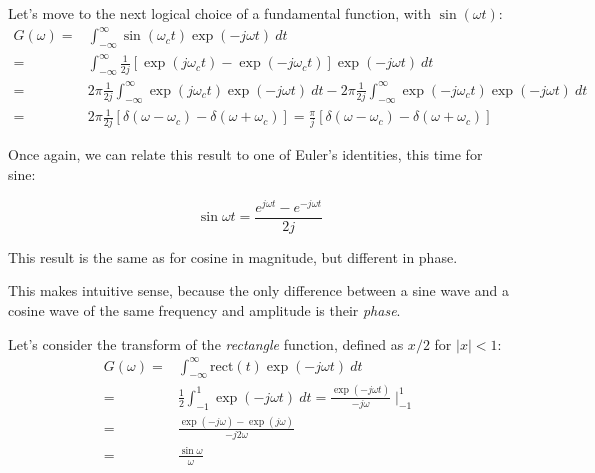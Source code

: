 \documentclass[11pt,letterpaper,draft]{exam}
\begin{document}
Let's move to the next logical choice of a fundamental function, with $\sin(\omega t)$:
\begin{equation}
\begin{split}
G(\omega) =& \int^{\infty}_{-\infty}\sin(\omega_c t)\exp(-j\omega t)~dt\\
=& \int^{\infty}_{-\infty}\frac{1}{2j}[\exp(j\omega_c t)-\exp(-j\omega_c
t)]\exp(-j\omega t)~dt\\
=& 2\pi\frac{1}{2j}\int^{\infty}_{-\infty}\exp(j\omega_c t)\exp(-j\omega
t)~dt - 2\pi\frac{1}{2j}\int^{\infty}_{-\infty}\exp(-j\omega_c t)\exp(-j\omega
t)~dt\\
=& 2\pi\frac{1}{2j}[\delta(\omega-\omega_c)-\delta(\omega+\omega_c)] =
\frac{\pi}{j}[\delta(\omega-\omega_c)-\delta(\omega+\omega_c)]
\end{split}
\end{equation}

Once again, we can relate this result to one of Euler's identities,
this time for sine:

\begin{equation*}
\sin \omega t = \frac{e^{j \omega t} - e^{-j \omega t}}{2j}
\end{equation*}

This result is the same as for cosine in magnitude, but different in
phase.  

This makes intuitive sense, because the only difference between a sine
wave and a cosine wave of the same frequency and amplitude is their
\textit{phase}.


Let's consider the transform of the \textit{rectangle} function, defined
as $x/2$ for $|x|<1$:
\begin{equation}
\begin{split}
G(\omega) =& \int^{\infty}_{-\infty}\text{rect}(t)\exp(-j\omega t)~dt\\
=& \frac{1}{2}\int^{1}_{-1}\exp(-j\omega t)~dt = 
\frac{\exp(-j\omega t)}{-j\omega}\mid^{1}_{-1}\\
=& \frac{\exp(-j\omega)-\exp(j\omega)}{-j2\omega}\\
=& \frac{\sin\omega}{\omega}
\end{split}
\end{equation}
\end{document}
